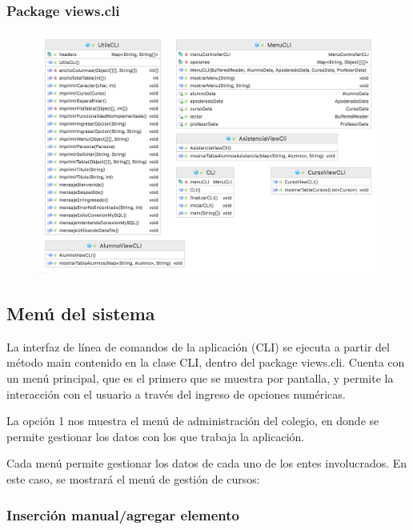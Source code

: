 \subsubsection*{Package views.cli}

\begin{figure}[h]
    \centering
    \includegraphics[width=1\textwidth]{contents/img/paq/views.cli}
\end{figure}

\subsection{Menú del sistema}

La interfaz de línea de comandos de la aplicación (CLI) se ejecuta a partir del método main contenido en la clase CLI, dentro del package views.cli. Cuenta con un menú principal, que es el primero que se muestra por pantalla, y permite la interacción con el usuario a través del ingreso de opciones numéricas.


La opción 1 nos muestra el menú de administración del colegio, en donde se permite gestionar los datos con los que trabaja la aplicación.


Cada menú permite gestionar los datos de cada uno de los entes involucrados. En este caso, se mostrará el menú de gestión de cursos:


\subsubsection{Inserción manual/agregar elemento}

